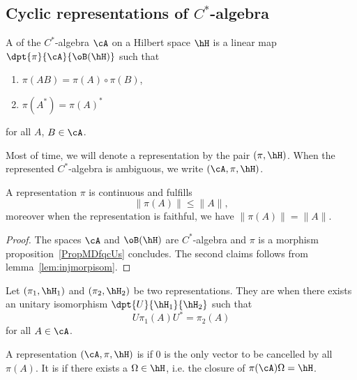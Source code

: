 \subsection{Cyclic representations of \texorpdfstring{$C^*$}{C*}-algebra }

\begin{definition}
A  of the $C^*$-algebra $\cA$ on a Hilbert space $\hH$ is a linear map $\dpt{\pi}{\cA}{\oB(\hH)}$ such that

\begin{enumerate}
\item $\pi(AB)=\pi(A)\circ\pi(B)$,
\item $\pi(A^*)=\pi(A)^*$
\end{enumerate}
for all $A$, $B\in\cA$.
\end{definition}
Most of time, we will denote a representation by the pair $(\pi,\hH)$. When the represented $C^*$-algebra is ambiguous, we write $(\cA,\pi,\hH)$.

\begin{lemma}       \label{Lemrepresnormpresou}
A representation $\pi$ is continuous and fulfills
\begin{equation}
\| \pi(A) \|\leq \| A \|,
\end{equation}
moreover when the representation is faithful, we have $\| \pi(A) \|=\| A \|$.
\end{lemma}

\begin{proof}
The spaces $\cA$ and $\oB(\hH)$ are $C^*$-algebra and $\pi$ is a morphism proposition~\ref{PropMDfqcUs} concludes. The second claims follows from lemma~\ref{lem:injmorpisom}.
\end{proof}

Let $(\pi_1,\hH_1)$ and $(\pi_2,\hH_2)$ be two representations. They are  when there exists an unitary isomorphism $\dpt{U}{\hH_1}{\hH_2}$ such that
\begin{equation}
  U\pi_1(A)U^*=\pi_2(A)
\end{equation}
for all $A\in\cA$.

A representation $(\cA,\pi,\hH)$ is  if $0$ is the only vector to be cancelled by all $\pi(A)$. It is  if there exists a  $\Omega\in\hH$, i.e. the closure of $\pi(\cA)\Omega=\hH$.


